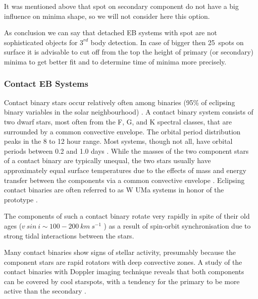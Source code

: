 \begin{table}[!h]
\begin{center}
\begin{tabular}{lccccc}
\end{tabular}
\end{center}
\label{tab:3rd_body_detached_spot}
\vspace{-6mm}
\end{table}

It was mentioned above that spot on secondary component do not have a big influence on minima shape, so we will not consider here this option.

As conclusion we can say that detached EB systems with spot are not sophisticated objects for $3^{rd}$ body detection. In case of bigger then 25\degree ~spots on surface it is advisable to cut off from the top the height of primary (or secondary) minima to get better fit and to determine time of minima more precisely.
 
\subsubsection{Contact EB Systems}
Contact binary stars occur relatively often among binaries (95\% of eclipsing binary
variables in the solar neighbourhood) \cite{Rucinski98}. 
A contact binary system consists of two dwarf stars, most often from the F, G, and K
spectral classes, that are surrounded by a common convective envelope. 
The orbital period distribution peaks in the 8 to 12 hour range. Most systems, though not all,
have orbital periods between 0.2 and 1.0 days \citep{Maceroni96, Paczynski2006}. 
While the masses of the two component stars of a contact binary
are typically unequal, the two stars usually have approximately equal surface temperatures due to the effects of
mass and energy transfer between the components via a common convective envelope \citep{Lucy68}. 
Eclipsing contact binaries are often referred to as W UMa systems in honor of the prototype \citep{Tran2013}.

The components of such a contact binary rotate very rapidly in spite of their old ages
($v~sin~i \sim 100 - 200~ km~s^{-1}$ ) as a result of spin-orbit synchronisation due to strong tidal interactions between the stars. 

Many contact binaries show signs of stellar activity, presumably because the component stars are rapid
rotators with deep convective zones. 
A study of the contact binaries with Doppler imaging
technique reveals that both components can be covered by cool starspots, with
a tendency for the primary to be more active than the secondary \citep{Maceroni94, Hendry2000, Barnes2004}.

